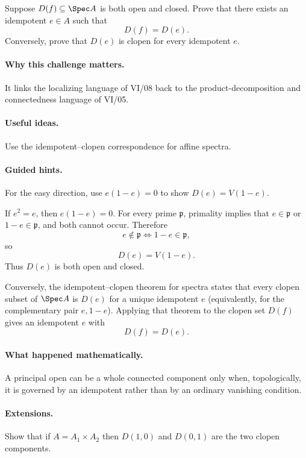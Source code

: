 \begin{problem}
Suppose $D(f)\subseteq\Spec A$ is both open and closed.  Prove that there exists an
idempotent $e\in A$ such that
\[
D(f)=D(e).
\]
Conversely, prove that $D(e)$ is clopen for every idempotent $e$.
\end{problem}

\paragraph{Why this challenge matters.}
It links the localizing language of VI/08 back to the product-decomposition and connectedness
language of VI/05.

\paragraph{Useful ideas.}
Use the idempotent--clopen correspondence for affine spectra.

\paragraph{Guided hints.}
For the easy direction, use $e(1-e)=0$ to show $D(e)=V(1-e)$.

\begin{solution}
If $e^2=e$, then $e(1-e)=0$.  For every prime $\mathfrak p$, primality implies that
$e\in\mathfrak p$ or $1-e\in\mathfrak p$, and both cannot occur.  Therefore
\[
e\notin\mathfrak p
\iff
1-e\in\mathfrak p,
\]
so
\[
D(e)=V(1-e).
\]
Thus $D(e)$ is both open and closed.

Conversely, the idempotent--clopen theorem for spectra states that every clopen subset of
$\Spec A$ is $D(e)$ for a unique idempotent $e$ (equivalently, for the complementary pair
$e,1-e$).  Applying that theorem to the clopen set $D(f)$ gives an idempotent $e$ with
\[
D(f)=D(e).
\]
\end{solution}

\paragraph{What happened mathematically.}
A principal open can be a whole connected component only when, topologically, it is governed
by an idempotent rather than by an ordinary vanishing condition.

\paragraph{Extensions.}
Show that if $A=A_1\times A_2$ then $D(1,0)$ and $D(0,1)$ are the two clopen components.
